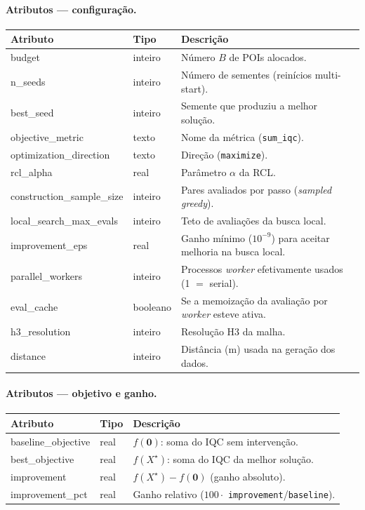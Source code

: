 \documentclass[11pt,a4paper]{article}
\begin{document}
\paragraph{Atributos --- configuração.}
\begin{center}\small
\begin{tabular}{@{}>{\ttfamily}l l p{8.0cm}@{}}
\toprule
\normalfont Atributo & \normalfont Tipo & \normalfont Descrição \\
\midrule
budget                 & inteiro & Número $B$ de POIs alocados. \\
n\_seeds               & inteiro & Número de sementes (reinícios multi-start). \\
best\_seed             & inteiro & Semente que produziu a melhor solução. \\
objective\_metric      & texto   & Nome da métrica (\texttt{sum\_iqc}). \\
optimization\_direction& texto   & Direção (\texttt{maximize}). \\
rcl\_alpha             & real    & Parâmetro $\alpha$ da RCL. \\
construction\_sample\_size & inteiro & Pares avaliados por passo (\emph{sampled greedy}). \\
local\_search\_max\_evals & inteiro & Teto de avaliações da busca local. \\
improvement\_eps       & real    & Ganho mínimo ($10^{-9}$) para aceitar melhoria na busca local. \\
parallel\_workers      & inteiro & Processos \emph{worker} efetivamente usados (1 $=$ serial). \\
eval\_cache            & booleano & Se a memoização da avaliação por \emph{worker} esteve ativa. \\
h3\_resolution         & inteiro & Resolução H3 da malha. \\
distance               & inteiro & Distância (m) usada na geração dos dados. \\
\bottomrule
\end{tabular}
\end{center}

\paragraph{Atributos --- objetivo e ganho.}
\begin{center}\small
\begin{tabular}{@{}>{\ttfamily}l l p{8.0cm}@{}}
\toprule
\normalfont Atributo & \normalfont Tipo & \normalfont Descrição \\
\midrule
baseline\_objective & real & $f(\mathbf 0)$: soma do IQC sem intervenção. \\
best\_objective     & real & $f(X^\star)$: soma do IQC da melhor solução. \\
improvement         & real & $f(X^\star)-f(\mathbf 0)$ (ganho absoluto). \\
improvement\_pct    & real & Ganho relativo ($100\cdot$ \texttt{improvement}/\texttt{baseline}). \\
\bottomrule
\end{tabular}
\end{center}
\end{document}
